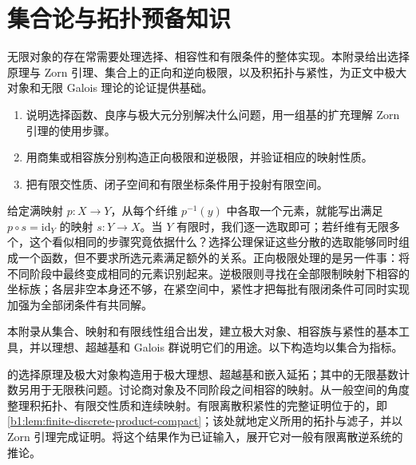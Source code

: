 
\chapter{集合论与拓扑预备知识}
\label{b1:app:A}

\begin{chapterabstract}
	无限对象的存在常需要处理选择、相容性和有限条件的整体实现。本附录给出选择原理与 Zorn 引理、集合上的正向和逆向极限，以及积拓扑与紧性，为正文中极大对象和无限 Galois 理论的论证提供基础。
\end{chapterabstract}

\begin{learninggoals}
	\begin{enumerate}
		\item 说明选择函数、良序与极大元分别解决什么问题，用一组基的扩充理解 Zorn 引理的使用步骤。
		\item 用商集或相容族分别构造正向极限和逆极限，并验证相应的映射性质。
		\item 把有限交性质、闭子空间和有限坐标条件用于投射有限空间。
	\end{enumerate}

\end{learninggoals}

给定满映射 \(p:X\to Y\)，从每个纤维 \(p^{-1}(y)\) 中各取一个元素，就能写出满足 \(p\circ s=\mathrm{id}_Y\) 的映射 \(s:Y\to X\)。当 \(Y\) 有限时，我们逐一选取即可；若纤维有无限多个，这个看似相同的步骤究竟依据什么？选择公理保证这些分散的选取能够同时组成一个函数，但不要求所选元素满足额外的关系。正向极限处理的是另一件事：将不同阶段中最终变成相同的元素识别起来。逆极限则寻找在全部限制映射下相容的坐标族；各层非空本身还不够，在紧空间中，紧性才把每批有限闭条件可同时实现加强为全部闭条件有共同解。

\ProseParagraphBreak

本附录从集合、映射和有限线性组合出发，建立极大对象、相容族与紧性的基本工具，并以理想、超越基和 Galois 群说明它们的用途。以下构造均以集合为指标。

\ProseParagraphBreak
{}的选择原理及极大对象构造用于极大理想、超越基和嵌入延拓；其中的无限基数计数另用于无限秩问题。讨论商对象及不同阶段之间相容的映射。从一般空间的角度整理积拓扑、有限交性质和连续映射。有限离散积紧性的完整证明位于的，即\cref{b1:lem:finite-discrete-product-compact}；该处就地定义所用的拓扑与滤子，并以 Zorn 引理完成证明。将这个结果作为已证输入，展开它对一般有限离散逆系统的推论。


